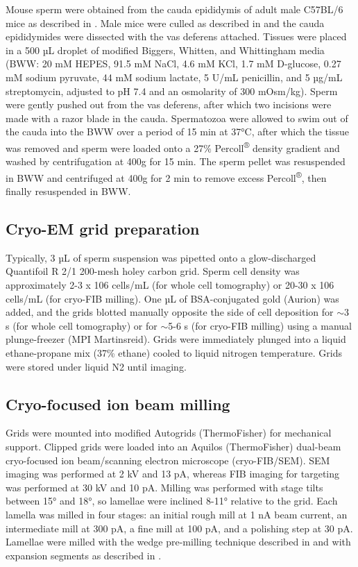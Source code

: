 Mouse sperm were obtained from the cauda epididymis of adult male C57BL/6 mice as described in \cite{Hutcheon2017}. Male mice were culled as described in \cite{Mederacke2015} and the cauda epididymides were dissected with the vas deferens attached. Tissues were placed in a 500 µL droplet of modified Biggers, Whitten, and Whittingham media (BWW: 20 mM HEPES, 91.5 mM NaCl, 4.6 mM KCl, 1.7 mM D-glucose, 0.27 mM sodium pyruvate, 44 mM sodium lactate, 5 U/mL penicillin, and 5 µg/mL streptomycin, adjusted to pH 7.4 and an osmolarity of 300 mOsm/kg). Sperm were gently pushed out from the vas deferens, after which two incisions were made with a razor blade in the cauda. Spermatozoa were allowed to swim out of the cauda into the BWW over a period of 15 min at 37°C, after which the tissue was removed and sperm were loaded onto a 27\% Percoll\textsuperscript{®} density gradient and washed by centrifugation at 400g for 15 min. The sperm pellet was resuspended in BWW and centrifuged at 400g for 2 min to remove excess Percoll\textsuperscript{®}, then finally resuspended in BWW.
%
\subsection*{Cryo-EM grid preparation}
Typically, 3 µL of sperm suspension was pipetted onto a glow-discharged Quantifoil R 2/1 200-mesh holey carbon grid. Sperm cell density was approximately 2-3 x 106 cells/mL (for whole cell tomography) or 20-30 x 106 cells/mL (for cryo-FIB milling). One µL of BSA-conjugated gold (Aurion) was added, and the grids blotted manually opposite the side of cell deposition for $\sim$3 s (for whole cell tomography) or for $\sim$5-6 s (for cryo-FIB milling) using a manual plunge-freezer (MPI Martinsreid). Grids were immediately plunged into a liquid ethane-propane mix (37\% ethane) \cite{Tivol2008} cooled to liquid nitrogen temperature. Grids were stored under liquid N2 until imaging.
%
\subsection*{Cryo-focused ion beam milling}
Grids were mounted into modified Autogrids (ThermoFisher) for mechanical support. Clipped grids were loaded into an Aquilos (ThermoFisher) dual-beam cryo-focused ion beam/scanning electron microscope (cryo-FIB/SEM). SEM imaging was performed at 2 kV and 13 pA, whereas FIB imaging for targeting was performed at 30 kV and 10 pA. Milling was performed with stage tilts between 15° and 18°, so lamellae were inclined 8-11° relative to the grid.  Each lamella was milled in four stages: an initial rough mill at 1 nA beam current, an intermediate mill at 300 pA, a fine mill at 100 pA, and a polishing step at 30 pA. Lamellae were milled with the wedge pre-milling technique described in \cite{Schaffer2017} and with expansion segments as described in \cite{Wolff2019}.
%
